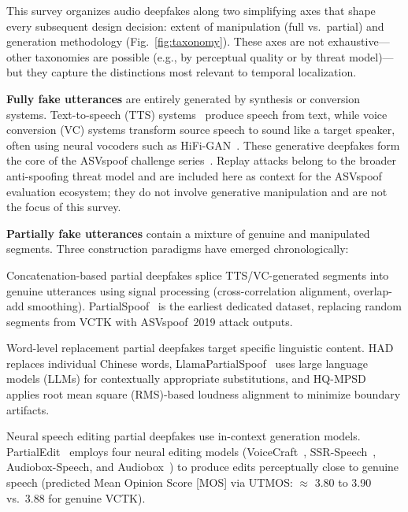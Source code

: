 \documentclass[journal]{IEEEtran}
\begin{document}
This survey organizes audio deepfakes along two simplifying axes that shape every subsequent design decision: extent of manipulation (full vs.\ partial) and generation methodology (Fig.~\ref{fig:taxonomy}). These axes are not exhaustive---other taxonomies are possible (e.g., by perceptual quality or by threat model)---but they capture the distinctions most relevant to temporal localization.

\textbf{Fully fake utterances} are entirely generated by synthesis or conversion systems. Text-to-speech (TTS) systems~\cite{tan2021ttssurvey} produce speech from text, while voice conversion (VC) systems transform source speech to sound like a target speaker, often using neural vocoders such as HiFi-GAN~\cite{kong2020hifi}. These generative deepfakes form the core of the ASVspoof challenge series~\cite{wang2020asvspoof2019}. Replay attacks belong to the broader anti-spoofing threat model and are included here as context for the ASVspoof evaluation ecosystem; they do not involve generative manipulation and are not the focus of this survey.

\textbf{Partially fake utterances} contain a mixture of genuine and manipulated segments. Three construction paradigms have emerged chronologically:

Concatenation-based partial deepfakes splice TTS/VC-generated segments into genuine utterances using signal processing (cross-correlation alignment, overlap-add smoothing). PartialSpoof~\cite{zhang2023partialspoof} is the earliest dedicated dataset, replacing random segments from VCTK with ASVspoof~2019 attack outputs.

Word-level replacement partial deepfakes target specific linguistic content. HAD~\cite{yi2021had} replaces individual Chinese words, LlamaPartialSpoof~\cite{luong2025llamapartialspoof} uses large language models (LLMs) for contextually appropriate substitutions, and HQ-MPSD~\cite{li2025hqmpsd} applies root mean square (RMS)-based loudness alignment to minimize boundary artifacts.

Neural speech editing partial deepfakes use in-context generation models. PartialEdit~\cite{zhang2025partialedit} employs four neural editing models (VoiceCraft~\cite{peng2024voicecraft}, SSR-Speech~\cite{wang2025ssrspeech}, Audiobox-Speech, and Audiobox~\cite{vyas2023audiobox}) to produce edits perceptually close to genuine speech (predicted Mean Opinion Score [MOS] via UTMOS: $\approx$ 3.80 to 3.90 vs.\ 3.88 for genuine VCTK).
\end{document}
